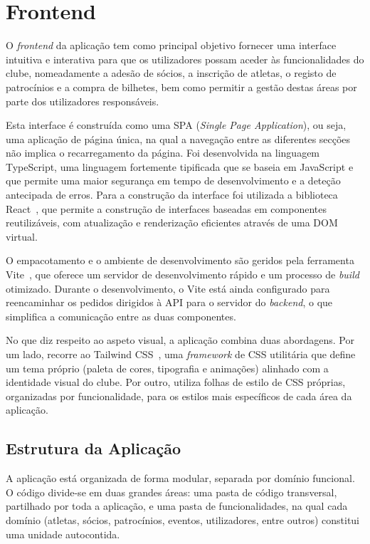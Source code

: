 \chapter{Frontend}

O \textit{frontend} da aplicação tem como principal objetivo fornecer uma 
interface intuitiva e interativa para que os utilizadores possam aceder às 
funcionalidades do clube, nomeadamente a adesão de sócios, a inscrição de 
atletas, o registo de patrocínios e a compra de bilhetes, bem como permitir a 
gestão destas áreas por parte dos utilizadores responsáveis.

Esta interface é construída como uma SPA (\textit{Single Page 
Application}), ou seja, uma aplicação de página única, na qual a 
navegação entre as diferentes secções não implica o recarregamento da página. 
Foi desenvolvida na linguagem TypeScript, uma linguagem 
fortemente tipificada que se baseia em JavaScript e que permite uma maior 
segurança em tempo de desenvolvimento e a deteção antecipada de erros. Para a 
construção da interface foi utilizada a biblioteca React~\cite{react}, que 
permite a construção de interfaces baseadas em componentes reutilizáveis, com 
atualização e renderização eficientes através de uma DOM virtual.

O empacotamento e o ambiente de desenvolvimento são geridos pela ferramenta 
Vite~\cite{vite}, que oferece um servidor de desenvolvimento rápido e um 
processo de \textit{build} otimizado. Durante o desenvolvimento, o Vite está 
ainda configurado para reencaminhar os pedidos dirigidos à API para o servidor 
do \textit{backend}, o que simplifica a comunicação entre as duas componentes.

No que diz respeito ao aspeto visual, a aplicação combina duas abordagens. Por 
um lado, recorre ao Tailwind CSS~\cite{tailwind}, uma \textit{framework} de CSS 
utilitária que define um tema próprio (paleta de cores, tipografia e animações) 
alinhado com a identidade visual do clube. Por outro, utiliza folhas de estilo 
de CSS próprias, organizadas por funcionalidade, para os estilos mais 
específicos de cada área da aplicação.

\section{Estrutura da Aplicação}

A aplicação está organizada de forma modular, separada por domínio funcional. 
O código divide-se em duas grandes áreas: uma pasta de código transversal, 
partilhado por toda a aplicação, e uma pasta de funcionalidades, na qual cada 
domínio (atletas, sócios, patrocínios, eventos, utilizadores, entre outros) 
constitui uma unidade autocontida.

